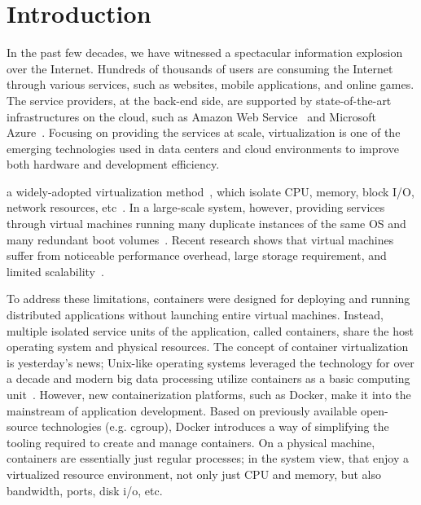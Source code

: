 \section{Introduction}
In the past few decades, we have witnessed a spectacular information explosion over the Internet.
Hundreds of thousands of users are consuming  the Internet through various services, such as websites, mobile applications, and online games.
The service providers, at the back-end side, are supported by state-of-the-art infrastructures on the cloud, such as Amazon Web Service~\cite{aws} and
Microsoft Azure~\cite{azure}. 
Focusing on providing the services at scale, 
virtualization is one of the emerging  technologies used in data centers and cloud environments to 
improve both hardware and development efficiency.

 a widely-adopted virtualization method~\cite{vm}, which isolate CPU, memory, 
block I/O, network resources, etc~\cite{jithin2014virtual}.
In a large-scale system, however,
providing services through virtual machines 
running many duplicate instances of the same OS and  many redundant boot volumes~\cite{medina2014survey}. 
Recent research shows that virtual machines suffer from noticeable performance overhead, large storage requirement, and 
limited scalability~\cite{xu2014managing}. 

To address these limitations, containers were designed for deploying
and running distributed applications without launching entire virtual machines. 
Instead, multiple isolated service units of the application, 
called containers, share the host operating system and physical resources.
The concept of container virtualization is yesterday's news;
Unix-like operating systems leveraged the technology for over a decade and modern 
big data processing  utilize containers as a basic computing unit~\cite{wang2014fresh, wang2015omo, wang2017seina}. 
However, new containerization platforms, such as Docker, make it into the mainstream of application development.
Based on previously available open-source technologies 
(e.g. cgroup), Docker introduces a way of simplifying the tooling required to create and manage containers.
On a physical machine, containers are essentially just regular processes; in the system view,  that enjoy a virtualized resource environment, not only just CPU and
memory, but also bandwidth, ports, disk i/o, etc. 

